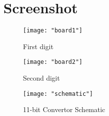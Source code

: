 \documentclass[11pt]{article}
\begin{document}
\section*{Screenshot}
\begin{figure}[ht]
	\centering
	\texttt{[image: "board1"]}
	\caption{First digit}
\end{figure}
\begin{figure}[ht]
	\centering
	\texttt{[image: "board2"]}
	\caption{Second digit}
	\texttt{[image: "schematic"]}
	\caption{11-bit Convertor Schematic}
\end{figure}

\end{document}
